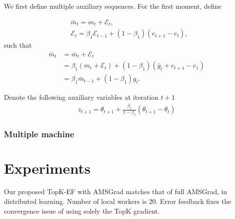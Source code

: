 \documentclass[11pt]{article}
\begin{document}
We first define multiple auxiliary sequences. For the first moment, define

\begin{align*}
    &\bar m_t=m_t+\mathcal E_t,\\   
    &\mathcal E_t=\beta_1\mathcal E_{t-1}+(1-\beta_1)(e_{t+1}-e_t),
\end{align*}
such that 
\begin{align*} 
    \bar m_t&=\bar m_t+\mathcal E_t\\
    &=\beta_1(m_t+\mathcal E_t)+(1-\beta_1)(\bar g_t+e_{t+1}-e_1)\\
    &=\beta_1\bar m_{t-1}+(1-\beta_1)g_t.
\end{align*}


Denote the following auxiliary variables at iteration $t+1$
\begin{align}
z_{t+1} = \theta_{t+1} + \frac{\beta_1}{1-\beta_1}(\theta_{t+1} - \theta_{t})
\end{align}


\subsubsection{Multiple machine}


\section{Experiments}\label{sec:experiment}
Our proposed TopK-EF with AMSGrad matches that of full AMSGrad, in distributed learning. Number of local workers is 20. Error feedback fixes the convergence issue of using solely the TopK gradient. 
\end{document}

